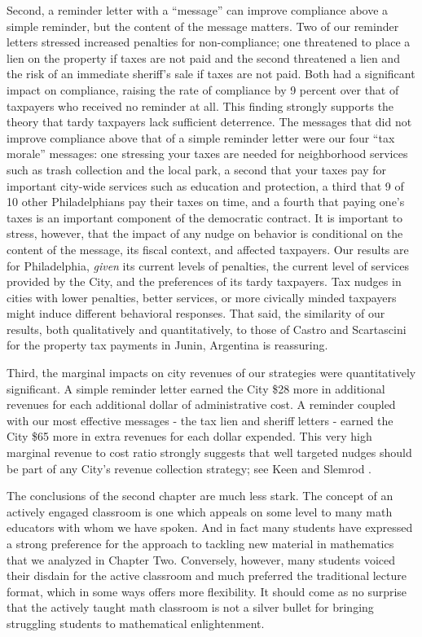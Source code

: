 Second, a reminder letter with a ``message'' can improve compliance
above a simple reminder, but the content of the message matters.  Two
of our reminder letters stressed increased penalties for
non-compliance; one threatened to place a lien on the property if
taxes are not paid and the second threatened a lien and the risk of an
immediate sheriff's sale if taxes are not paid.  Both had a
significant impact on compliance, raising the rate of compliance by 9
percent over that of taxpayers who received no reminder at all.  This finding
strongly supports the theory that tardy taxpayers lack sufficient deterrence.
The messages that did not improve compliance above that of a simple
reminder letter were our four ``tax morale'' messages: one stressing
your taxes are needed for neighborhood services such as trash
collection and the local park, a second that your taxes pay for
important city-wide services such as education and protection, a third
that 9 of 10 other Philadelphians pay their taxes on time, and a
fourth that paying one's taxes is an important component of the
democratic contract. It is important to stress, however, that the impact of any nudge on behavior is conditional on the content of the message, its fiscal context, and affected taxpayers. Our results are for Philadelphia, \textit{given} its current levels of penalties, the current level of services provided by the City, and the preferences of its tardy taxpayers. Tax nudges in cities with lower penalties, better services, or more civically minded taxpayers might induce different behavioral responses. That said, the similarity of our results, both qualitatively and quantitatively, to those of Castro and Scartascini \citeyear{castro} for the property tax payments in Junin, Argentina is reassuring.

Third, the marginal impacts on city revenues of our strategies were quantitatively significant. A simple reminder letter earned the City \$28 more in additional revenues for each additional dollar of administrative cost. A reminder coupled with our most effective messages - the tax lien and sheriff letters - earned the City \$65 more in extra revenues for each dollar expended. This very high marginal revenue to cost ratio strongly suggests that well targeted nudges should be part of any City's revenue collection strategy; see Keen and Slemrod \citeyear{keen2016optimal}.

The conclusions of the second chapter are much less stark. The concept of an actively engaged classroom is one which appeals on
some level to many math educators with whom we have spoken. And in fact
many students have expressed a strong preference for the approach to
tackling new material in mathematics that we analyzed in Chapter Two. Conversely, however, many students
voiced their disdain for the active classroom and much preferred the
traditional lecture format, which in some ways offers more flexibility.
It should come as no surprise that the actively taught math classroom is
not a silver bullet for bringing struggling students to mathematical
enlightenment.

